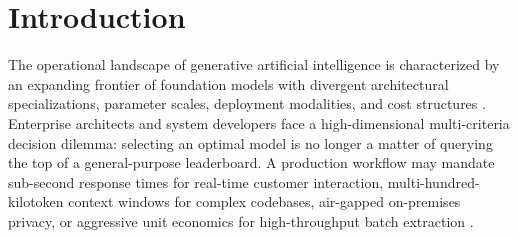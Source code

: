 \documentclass[pdflatex,sn-mathphys-num]{sn-jnl}
\theoremstyle{thmstyleone}
\theoremstyle{thmstylethree}
\begin{document}
\maketitle

\section{Introduction}\label{sec:introduction}

The operational landscape of generative artificial intelligence is characterized by an expanding frontier of foundation models with divergent architectural specializations, parameter scales, deployment modalities, and cost structures \cite{bommasani2021opportunities, kaplan2020scaling}. Enterprise architects and system developers face a high-dimensional multi-criteria decision dilemma: selecting an optimal model is no longer a matter of querying the top of a general-purpose leaderboard. A production workflow may mandate sub-second response times for real-time customer interaction, multi-hundred-kilotoken context windows for complex codebases, air-gapped on-premises privacy, or aggressive unit economics for high-throughput batch extraction \cite{zheng2024judging}.
\end{document}
